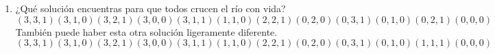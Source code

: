 \documentclass{article}
\begin{document}
\begin{enumerate}
		\item ¿Qué solución encuentras para que todos crucen el río con vida?		
		\\$(3, 3, 1) (3, 1, 0) (3, 2, 1) (3, 0, 0) (3, 1, 1) (1, 1, 0) (2, 2, 1) (0, 2, 0) (0, 3, 1) (0, 1, 0) (0, 2, 1) (0, 0, 0)$
		\\También puede haber esta otra solución ligeramente diferente.
				\\$(3, 3, 1) (3, 1, 0) (3, 2, 1) (3, 0, 0) (3, 1, 1) (1, 1, 0) (2, 2, 1) (0, 2, 0) (0, 3, 1) (0, 1, 0) (1, 1, 1) (0, 0, 0)$
	\end{enumerate}
\end{document}

